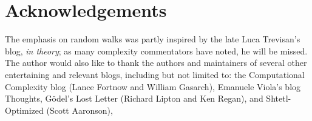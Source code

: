 \documentclass[12pt]{article}
\theoremstyle{definition}
\begin{document}
\section{Acknowledgements}

The emphasis on random walks was partly inspired by the late Luca
Trevisan's blog, {\em in theory}; as many complexity commentators
have noted, he will be missed. The author would also like to thank
the authors and maintainers of several other entertaining and
relevant blogs, including but not limited to: the Computational
Complexity blog (Lance Fortnow and William Gasarch), Emanuele Viola's
blog Thoughts, G\"odel's Lost Letter (Richard Lipton and Ken Regan),
and Shtetl-Optimized (Scott Aaronson),



\end{document}
